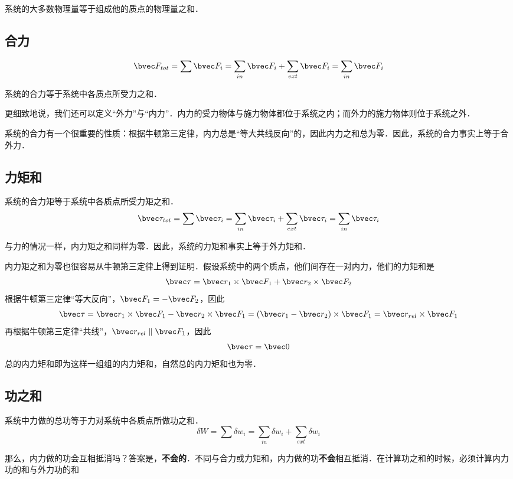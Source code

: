 

系统的大多数物理量等于组成他的质点的物理量之和．
\subsection{合力}
\begin{equation}
\bvec F_{tot}=\sum \bvec F_i=\sum_{in} \bvec F_i + \sum_{ext} \bvec F_i = \sum_{in} \bvec F_i
\end{equation}

系统的合力等于系统中各质点所受力之和．

更细致地说，我们还可以定义“外力”与“内力”．内力的受力物体与施力物体都位于系统之内；而外力的施力物体则位于系统之外．

系统的合力有一个很重要的性质：根据牛顿第三定律，内力总是“等大共线反向”的，因此内力之和总为零．因此，系统的合力事实上等于合外力．

\subsection{力矩和}
系统的合力矩等于系统中各质点所受力矩之和．
\begin{equation}
\bvec \tau_{tot}=\sum \bvec \tau_i=\sum_{in} \bvec \tau_i + \sum_{ext} \bvec \tau_i = \sum_{in} \bvec \tau_i
\end{equation}

与力的情况一样，内力矩之和同样为零．因此，系统的力矩和事实上等于外力矩和．

内力矩之和为零也很容易从牛顿第三定律上得到证明．假设系统中的两个质点，他们间存在一对内力，他们的力矩和是
$$\bvec \tau = \bvec r_1 \times \bvec F_1 + \bvec r_2 \times \bvec F_2$$
根据牛顿第三定律“等大反向”，$\bvec F_1=-\bvec F_2$，因此
$$\bvec \tau = \bvec r_1 \times \bvec F_1 - \bvec r_2 \times \bvec F_1 = (\bvec r_1 - \bvec r_2) \times \bvec F_1 = \bvec r_{rel}\times \bvec F_1$$
再根据牛顿第三定律“共线”，$\bvec r_{rel} \parallel \bvec F_1 $，因此
$$\bvec \tau = \bvec 0$$
总的内力矩和即为这样一组组的内力矩和，自然总的内力矩和也为零．

\subsection{功之和}
系统中力做的总功等于力对系统中各质点所做功之和．
\begin{equation}
\delta W = \sum \delta w_i = \sum_{in} \delta w_i + \sum_{ext} \delta w_i
\end{equation}

那么，内力做的功会互相抵消吗？答案是，\textbf{不会的}．不同与合力或力矩和，内力做的功\textbf{不会}相互抵消．在计算功之和的时候，必须计算内力功的和与外力功的和
